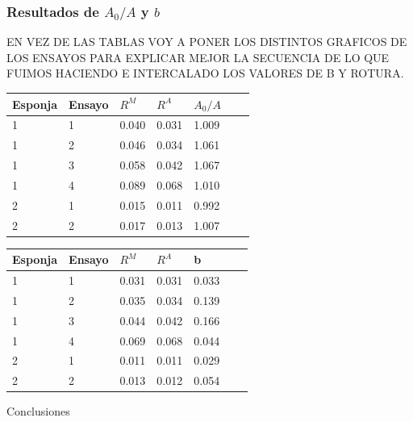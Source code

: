 \documentclass[usenames,dvipsnames]{beamer}
\begin{document}
\begin{frame}

\frametitle{Resultados de ${A_0}/A$ y $b$} 

EN VEZ DE LAS TABLAS VOY A PONER LOS DISTINTOS GRAFICOS DE LOS ENSAYOS PARA EXPLICAR MEJOR LA SECUENCIA DE LO QUE FUIMOS HACIENDO E INTERCALADO LOS VALORES DE B Y ROTURA.

\begin{multicols}{2}
  \begin{table} 
 \tiny
 \begin{center} 
  \begin{tabular}{@{}lllllll@{}} \toprule
  Esponja & Ensayo   &    $R^M$    &  $R^A$ &  $A_0/A$ \\ \midrule
  1   & 1       &  0.040  & 0.031 & 1.009  \\
  1   & 2       &  0.046  & 0.034 &  1.061  \\
  1   & 3       &  0.058  & 0.042 &  1.067  \\
  1   & 4     &  0.089  & 0.068 &  1.010 \\
  2   & 1     &  0.015  & 0.011 &  0.992  \\
  2   & 2    &  0.017  & 0.013 &  1.007   \\
  \bottomrule
  \end{tabular}
\end{center}
  \end{table}




\begin{table} 
\tiny
\begin{center} 
\begin{tabular}{@{}lllllll@{}} \toprule
Esponja &Ensayo   &    $R^M$    &  ${R^A}$ &  b \\ \midrule
1 & 1       &  0.031  & 0.031   & 0.033  \\
1 & 2       &  0.035  & 0.034  &  0.139  \\
1 & 3       &  0.044  & 0.042  &  0.166  \\
1 & 4      &  0.069 &	0.068 &	0.044 \\
2 & 1      &  0.011 &	0.011 & 0.029 \\
2 & 2      &  0.013 &	0.012 & 0.054\\
 \bottomrule

 \end{tabular}

\end{center}
\end{table}

\end{multicols}
\end{frame}


\begin{frame}
 Conclusiones
\end{frame}
\end{document}
